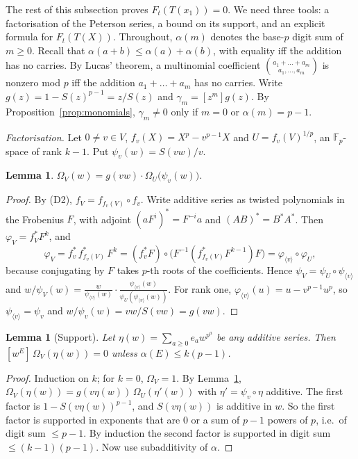 \documentclass[11pt]{amsart}
\newtheorem{lemma}[theorem]{Lemma}
\theoremstyle{definition}
\theoremstyle{remark}
\newcommand{\F}{\mathbb{F}_p}
\newcommand{\coef}[1]{\left[#1\right]}
\begin{document}
The rest of this subsection proves $F_t(T(x_1))=0$.  We need three tools: a
factorisation of the Peterson series, a bound on its support, and an explicit
formula for $F_t(T(X))$.  Throughout, $\alpha(m)$ denotes the base-$p$ digit
sum of $m\ge0$.  Recall that $\alpha(a+b)\le\alpha(a)+\alpha(b)$, with
equality iff the addition has no carries.  By Lucas' theorem, a multinomial
coefficient $\binom{a_1+\dots+a_m}{a_1,\dots,a_m}$ is nonzero mod $p$ iff the
addition $a_1+\dots+a_m$ has no carries.  Write
$g(z)=1-S(z)^{p-1}=z/S(z)$ and $\gamma_m=\coef{z^m}g(z)$.  By
Proposition~\ref{prop:monomials}, $\gamma_m\ne0$ only if $m=0$ or
$\alpha(m)=p-1$.

\emph{Factorisation.}  Let $0\ne v\in V$, $f_v(X)=X^p-v^{p-1}X$ and
$U=f_v(V)^{1/p}$, an $\F$-space of rank $k-1$.  Put $\psi_v(w)=S(vw)/v$.

\begin{lemma}\label{lem:factor}
$\Omega_V(w)=g(vw)\cdot\Omega_U\bigl(\psi_v(w)\bigr)$.
\end{lemma}

\begin{proof}
By (D2), $f_V=f_{f_v(V)}\circ f_v$.  Write additive series as twisted
polynomials in the Frobenius $F$, with adjoint $(aF^i)^*=F^{-i}a$ and
$(AB)^*=B^*A^*$.  Then $\varphi_V=f_V^*F^k$, and
\[
  \varphi_V=f_v^*\,f_{f_v(V)}^*\,F^k=(f_v^*F)\circ\bigl(F^{-1}(f_{f_v(V)}^*F^{k-1})F\bigr)
  =\varphi_{\langle v\rangle}\circ\varphi_U ,
\]
because conjugating by $F$ takes $p$-th roots of the coefficients.  Hence
$\psi_V=\psi_U\circ\psi_{\langle v\rangle}$ and
$w/\psi_V(w)=\frac{w}{\psi_{\langle v\rangle}(w)}\cdot
\frac{\psi_{\langle v\rangle}(w)}{\psi_U(\psi_{\langle v\rangle}(w))}$.  For rank
one, $\varphi_{\langle v\rangle}(u)=u-v^{p-1}u^p$, so
$\psi_{\langle v\rangle}=\psi_v$ and $w/\psi_v(w)=vw/S(vw)=g(vw)$.
\end{proof}

\begin{lemma}[Support]\label{lem:support}
Let $\eta(w)=\sum_{a\ge0}e_aw^{p^a}$ be any additive series.  Then
$\coef{w^E}\,\Omega_V(\eta(w))=0$ unless $\alpha(E)\le k(p-1)$.
\end{lemma}

\begin{proof}
Induction on $k$; for $k=0$, $\Omega_V=1$.  By Lemma~\ref{lem:factor},
$\Omega_V(\eta(w))=g(v\eta(w))\,\Omega_U(\eta'(w))$ with $\eta'=\psi_v\circ\eta$
additive.  The first factor is $1-S(v\eta(w))^{p-1}$, and $S(v\eta(w))$ is
additive in $w$.  So the first factor is supported in exponents that are $0$ or
a sum of $p-1$ powers of $p$, i.e.\ of digit sum $\le p-1$.  By induction the
second factor is supported in digit sum $\le(k-1)(p-1)$.  Now use
subadditivity of $\alpha$.
\end{proof}
\end{document}
